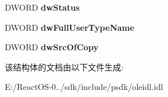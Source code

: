 \begin{DoxyCompactItemize}
D\+W\+O\+RD {\bfseries dw\+Status}
\item 
\mbox{\label{struct_i_o_l_e_types_1_1tag_o_b_j_e_c_t_d_e_s_c_r_i_p_t_o_r_ab1155e3451400498e2958628cb06423e}} 
D\+W\+O\+RD {\bfseries dw\+Full\+User\+Type\+Name}
\item 
\mbox{\label{struct_i_o_l_e_types_1_1tag_o_b_j_e_c_t_d_e_s_c_r_i_p_t_o_r_ae62218778c35a8f95818aa6e48479f6f}} 
D\+W\+O\+RD {\bfseries dw\+Src\+Of\+Copy}
\end{DoxyCompactItemize}


该结构体的文档由以下文件生成\+:\begin{DoxyCompactItemize}
\item 
E\+:/\+React\+O\+S-\/0../sdk/include/psdk/oleidl.\+idl\end{DoxyCompactItemize}
